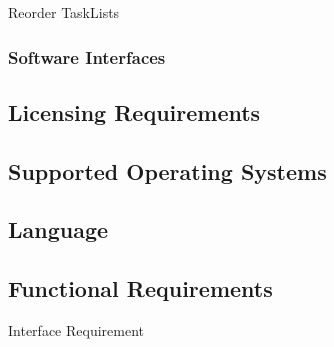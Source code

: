 \begin{requirement}{Reorder TaskLists}
\end{requirement}

	
	\subsubsection{Software Interfaces}
	\label{requirements:interfaces:software}

	

\subsection{Licensing Requirements}
\label{requirements:license}

\subsection{Supported Operating Systems}
\label{requirements:os}

\subsection{Language}
\label{requirements:language}


\subsection{Functional Requirements} %
\label{requirements:functional}

\begin{requirement}{Interface Requirement}
\end{requirement}


